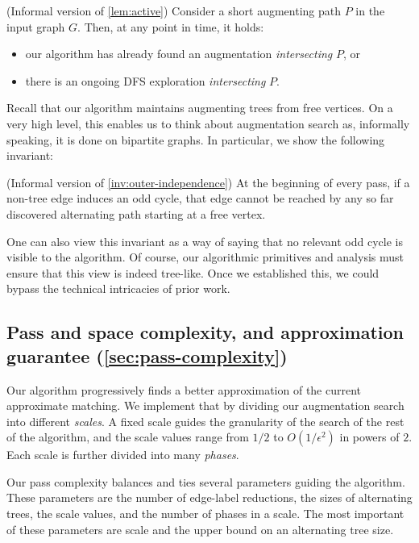 \documentclass{article}
\newcommand{\eps}{\epsilon}
\begin{document}
\begin{mdframed}[backgroundcolor=gray!10, linecolor=brown!40!black, roundcorner=5pt]
    ({Informal version of \cref{lem:active}}) Consider a short augmenting path $P$ in the input graph $G$. Then, at any point in time, it holds: 
    \begin{itemize}
        \item our algorithm has already found an augmentation \emph{intersecting} $P$, or 
        \item there is an ongoing DFS exploration \emph{intersecting} $P$.
    \end{itemize}
\end{mdframed}

Recall that our algorithm maintains augmenting trees from free vertices. 
On a very high level, this enables us to think about augmentation search as, informally speaking, it is done on bipartite graphs. In particular, we show the following invariant:
\begin{mdframed}[backgroundcolor=gray!10, linecolor=brown!40!black, roundcorner=5pt]
    ({Informal version of \cref{inv:outer-independence}}) 
    At the beginning of every pass, if a non-tree edge induces an odd cycle, that edge cannot be reached by any so far discovered alternating path starting at a free vertex.
\end{mdframed}
One can also view this invariant as a way of saying that no relevant odd cycle is visible to the algorithm.
Of course, our algorithmic primitives and analysis must ensure that this view is indeed tree-like. Once we established this, we could bypass the technical intricacies of prior work.

\subsection{Pass and space complexity, and approximation guarantee (\cref{sec:pass-complexity})}
Our algorithm progressively finds a better approximation of the current approximate matching.
We implement that by dividing our augmentation search into different \emph{scales}.
A fixed scale guides the granularity of the search of the rest of the algorithm, and the scale values range from $1/2$ to $O(1/\eps^2)$ in powers of $2$. Each scale is further divided into many \emph{phases}. 

Our pass complexity balances and ties several parameters guiding the algorithm. These parameters are the number of edge-label reductions, the sizes of alternating trees, the scale values, and the number of phases in a scale. The most important of these parameters are scale and the upper bound on an alternating tree size.
\end{document}

